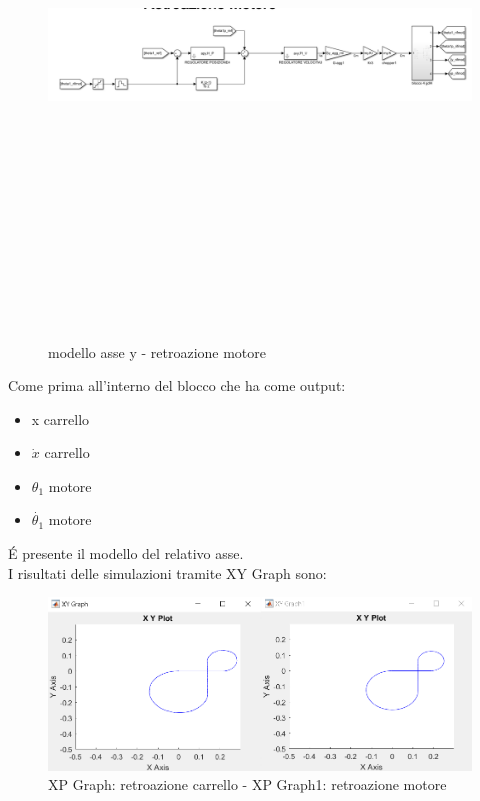 \documentclass{article}
\begin{document}
\begin{figure}[H]
\centering
\includegraphics[width=12cm,height=15cm,keepaspectratio]{./strategia_sim/PImoty.png}
\caption{ modello asse y - retroazione motore}
\end{figure}

Come prima all'interno del blocco che ha come output:

\begin{itemize}
    \item x carrello
    \item $\dot{x}$ carrello
    \item $\theta_1$ motore
    \item $\dot{\theta_1}$ motore
\end{itemize}
\'E presente il modello del relativo asse.\\
I risultati delle simulazioni tramite XY Graph sono:

\begin{figure}[H]
\centering
\includegraphics[width=.9\textwidth]{./strategia_sim/PIdis.png}
\caption{   XP Graph: retroazione carrello -
            XP Graph1: retroazione motore }
\end{figure}
\end{document}
